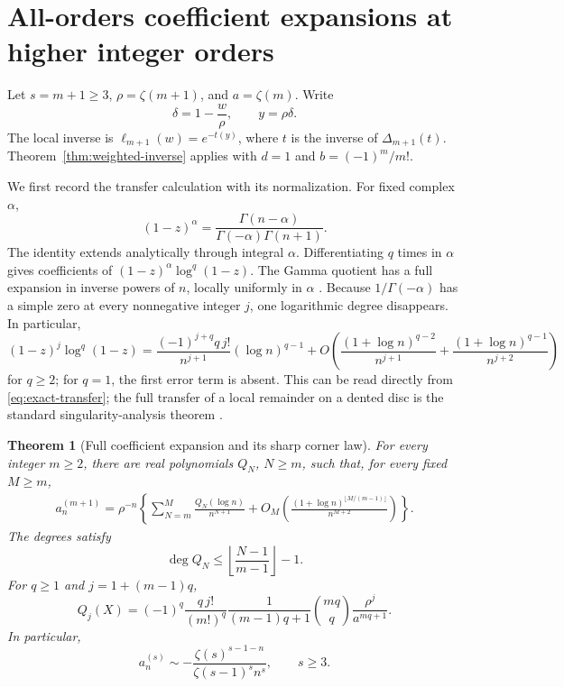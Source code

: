 \documentclass[11pt,a4paper]{article}
\numberwithin{equation}{section}
\newtheorem{theorem}{Theorem}[section]
\theoremstyle{definition}
\theoremstyle{remark}
\newcommand{\LiInv}{\ell}
\begin{document}
\section{All-orders coefficient expansions at higher integer orders}
\label{sec:coeff-higher}

Let \(s=m+1\ge3\), \(\rho=\zeta(m+1)\), and \(a=\zeta(m)\).
Write
\[
 \delta=1-\frac w\rho,\qquad y=\rho\delta.
\]
The local inverse is
\(\LiInv_{m+1}(w)=e^{-t(y)}\), where \(t\) is the inverse of
\(\Delta_{m+1}(t)\).
Theorem~\ref{thm:weighted-inverse} applies with \(d=1\) and
\(b=(-1)^m/m!\).

We first record the transfer calculation with its normalization.
For fixed complex \(\alpha\),
\begin{equation}
 [z^n](1-z)^\alpha
 =\frac{\Gamma(n-\alpha)}
        {\Gamma(-\alpha)\Gamma(n+1)}.
 \label{eq:exact-transfer}
\end{equation}
The identity extends analytically through integral \(\alpha\).
Differentiating \(q\) times in \(\alpha\) gives coefficients of
\((1-z)^\alpha\log^q(1-z)\).
The Gamma quotient has a full expansion in inverse powers of \(n\),
locally uniformly in \(\alpha\) \cite{dlmf-gamma}.
Because \(1/\Gamma(-\alpha)\) has a simple zero at every
nonnegative integer \(j\), one logarithmic degree disappears.
In particular,
\begin{equation}
 [z^n](1-z)^j\log^q(1-z)
 =
 \frac{(-1)^{j+q}q\,j!}{n^{j+1}}(\log n)^{q-1}
 +O\left(\frac{(1+\log n)^{q-2}}{n^{j+1}}
         +\frac{(1+\log n)^{q-1}}{n^{j+2}}\right)
 \label{eq:top-transfer}
\end{equation}
for \(q\ge2\); for \(q=1\), the first error term is absent.
This can be read directly from \eqref{eq:exact-transfer};
the full transfer of a local remainder on a dented disc is the
standard singularity-analysis theorem \cite{fs}.

\begin{theorem}[Full coefficient expansion and its sharp corner law]
\label{thm:coeff-higher}
For every integer \(m\ge2\), there are real polynomials \(Q_N\), \(N\ge m\),
such that, for every fixed \(M\ge m\),
\begin{align}
 a_n^{(m+1)}
 =\rho^{-n}\left\{
 \sum_{N=m}^{M}\frac{Q_N(\log n)}{n^{N+1}}
 +O_M\left(\frac{(1+\log n)^{\lfloor M/(m-1)\rfloor}}
                   {n^{M+2}}\right)\right\}.
 \label{eq:full-higher}
\end{align}
The degrees satisfy
\begin{equation}
 \deg Q_N\le
 \left\lfloor\frac{N-1}{m-1}\right\rfloor-1.
 \label{eq:QNdegree}
\end{equation}
For \(q\ge1\) and \(j=1+(m-1)q\),
\begin{equation}
 [X^{q-1}]Q_j(X)=
 (-1)^q
 \frac{q\,j!}{(m!)^q}
 \frac{1}{(m-1)q+1}\binom{mq}{q}
 \frac{\rho^j}{a^{mq+1}}.
 \label{eq:QNcorner}
\end{equation}
In particular,
\begin{equation}
 a_n^{(s)}\sim
 -\frac{\zeta(s)^{s-1-n}}{\zeta(s-1)^s n^s},
 \qquad s\ge3.
 \label{eq:higher-leading}
\end{equation}
\end{theorem}
\end{document}
